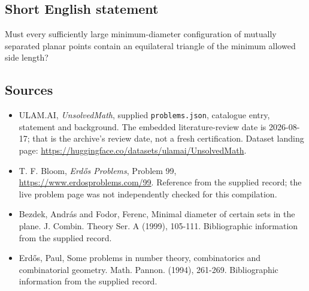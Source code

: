 \documentclass[11pt,a4paper]{article}
\begin{document}
\subsection{Short English statement}

Must every sufficiently large minimum-diameter configuration of mutually separated planar points contain an equilateral triangle of the minimum allowed side length?

\subsection{Sources}

{\small

\begin{itemize}

\item[\hypertarget{source:statement:1}{S1}] ULAM.AI, \emph{UnsolvedMath}, supplied \texttt{problems.json}, catalogue entry, statement and background. The embedded literature-review date is 2026-08-17; that is the archive’s review date, not a fresh certification. Dataset landing page: \url{https://huggingface.co/datasets/ulamai/UnsolvedMath}.

\item[\hypertarget{source:statement:2}{S2}] T. F. Bloom, \emph{Erdős Problems}, Problem 99, \url{https://www.erdosproblems.com/99}. Reference from the supplied record; the live problem page was not independently checked for this compilation.

\item[\hypertarget{source:statement:3}{S3}] Bezdek, Andr\'{a}s and Fodor, Ferenc, Minimal diameter of certain sets in the plane. J. Combin. Theory Ser. A (1999), 105-111. Bibliographic information from the supplied record.

\item[\hypertarget{source:statement:4}{S4}] Erd\H{o}s, Paul, Some problems in number theory, combinatorics and combinatorial geometry. Math. Pannon. (1994), 261-269. Bibliographic information from the supplied record.

\end{itemize}

}

\label{end:statement}
\end{document}
